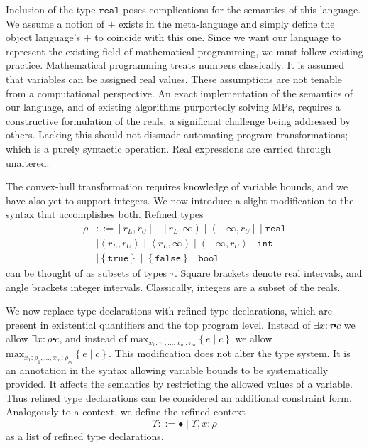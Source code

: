 \documentclass[preprint]{sigplanconf}%
\theoremstyle{remark}
\begin{document}
Inclusion of the type $\mathtt{real}$ poses complications for the semantics of
this language. We assume a notion of $+$ exists in the meta-language and
simply define the object language's $+$ to coincide with this one. Since we
want our language to represent the existing field of mathematical programming,
we must follow existing practice. Mathematical programming treats numbers
classically. It is assumed that variables can be assigned real values. These
assumptions are not tenable from a computational perspective. An exact
implementation of the semantics of our language, and of existing algorithms
purportedly solving MPs, requires a constructive formulation of the reals, a
significant challenge being addressed by others. Lacking this should not
dissuade automating program transformations; which is a purely syntactic
operation. Real expressions are carried through unaltered.

The convex-hull transformation requires knowledge of variable bounds, and we
have also yet to support integers. We now introduce a slight modification to
the syntax that accomplishes both. Refined types%
\begin{align}
\rho &  ::=\left[  r_{L},r_{U}\right]  \mid\left[  r_{L},\infty\right)
\mid\left(  -\infty,r_{U}\right]  \mid\mathtt{real}\nonumber\\
&  \mid\left\langle r_{L},r_{U}\right\rangle \mid\left\langle r_{L}%
,\infty\right)  \mid\left(  -\infty,r_{U}\right\rangle \mid\mathtt{int}%
\nonumber\\
&  \mid\left\{  \mathtt{true}\right\}  \mid\left\{  \mathtt{false}\right\}
\mid\mathtt{bool}%
\end{align}
can be thought of as subsets of types $\tau$. Square brackets denote real
intervals, and angle brackets integer intervals. Classically, integers are a
subset of the reals.

We now replace type declarations with refined type declarations, which are
present in existential quantifiers and the top program level. Instead of
$\exists x\!:\!\tau\centerdot c$ we allow $\exists x\!:\!\rho\centerdot c$,
and instead of $\mathrm{max}_{x_{1}:\tau_{1},\ldots,x_{m}:\tau_{m}}\left\{
e\mid c\right\}  $ we allow $\mathrm{max}_{x_{1}:\rho_{1},\ldots,x_{m}%
:\rho_{m}}\left\{  e\mid c\right\}  $. This modification does not alter the
type system. It is an annotation in the syntax allowing variable bounds to be
systematically provided. It affects the semantics by restricting the allowed
values of a variable. Thus refined type declarations can be considered an
additional constraint form. Analogously to a context, we define the refined
context%
\begin{equation}
\Upsilon::=\bullet\mid\Upsilon,x\!:\!\rho
\end{equation}
as a list of refined type declarations.
\end{document}
